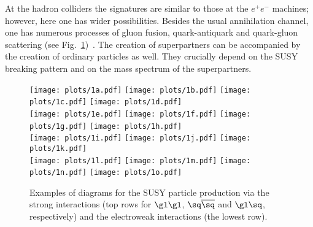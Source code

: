 \documentclass{cernyrep}
\begin{document}
\noindent At the hadron colliders the signatures  are similar to
those at the $e^+e^-$ machines; however, here one has wider
possibilities. Besides the usual annihilation channel, one has
numerous processes of gluon fusion, quark-antiquark and
quark-gluon scattering (see Fig.~\ref{f1})~\cite{SUSYLHC_GK}. The creation of  superpartners can be accompanied by the creation
of ordinary particles as well. They crucially depend on the
SUSY breaking pattern and on the mass spectrum of the
superpartners.
\begin{figure}[htb]
\begin{center}
\leavevmode \hspace*{-2mm}
\texttt{[image: plots/1a.pdf]}
\texttt{[image: plots/1b.pdf]}
\texttt{[image: plots/1c.pdf]}
\texttt{[image: plots/1d.pdf]}\\[6mm]
\texttt{[image: plots/1e.pdf]}
\texttt{[image: plots/1f.pdf]}
\texttt{[image: plots/1g.pdf]}
\texttt{[image: plots/1h.pdf]}\\[6mm]
\texttt{[image: plots/1i.pdf]}
\texttt{[image: plots/1j.pdf]}
\texttt{[image: plots/1k.pdf]}\\[6mm]
\texttt{[image: plots/1l.pdf]}
\texttt{[image: plots/1m.pdf]}
\texttt{[image: plots/1n.pdf]}
\texttt{[image: plots/1o.pdf]}
\end{center}
\caption{Examples of diagrams for the SUSY particle production
via the strong interactions (top rows for $\gl\gl$,
$\sq\overline{\sq}$ and $\gl\sq$, respectively) and the electroweak
interactions (the lowest row).}
\label{f1}
\end{figure}
\end{document}
